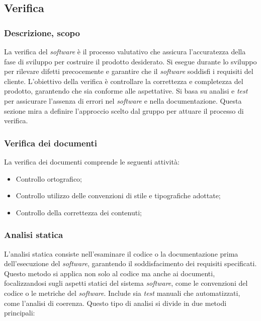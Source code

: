 \documentclass[5pt]{article}
\begin{document}
\subsection{Verifica}

    \subsubsection{Descrizione, scopo}
    La verifica del \textit{software} è il processo valutativo che assicura l'accuratezza della fase di sviluppo per costruire il prodotto desiderato. Si esegue durante lo sviluppo per rilevare difetti precocemente e garantire che il \textit{software} soddisfi i requisiti del cliente. L'obiettivo della verifica è controllare la correttezza e completezza del prodotto, garantendo che sia conforme alle aspettative. Si basa su analisi e \textit{test} per assicurare l'assenza di errori nel \textit{software} e nella documentazione. Questa sezione mira a definire l'approccio scelto dal gruppo per attuare il processo di verifica.
    
    \subsubsection{Verifica dei documenti}
    La verifica dei documenti comprende le seguenti attività:
    \begin{itemize}
    	\item Controllo ortografico;
    	\item Controllo utilizzo delle convenzioni di stile e tipografiche adottate;
    	\item Controllo della correttezza dei contenuti;
    \end{itemize}
    
    \subsubsection{Analisi statica}
    L'analisi statica consiste nell'esaminare il codice o la documentazione prima dell'esecuzione del \textit{software}, garantendo il soddisfacimento dei requisiti specificati. Questo metodo si applica non solo al codice ma anche ai documenti, focalizzandosi sugli aspetti statici del sistema \textit{software}, come le convenzioni del codice o le metriche del \textit{software}. Include sia \textit{test} manuali che automatizzati, come l'analisi di coerenza.
    Questo tipo di analisi si divide in due metodi principali: 
\end{document}
